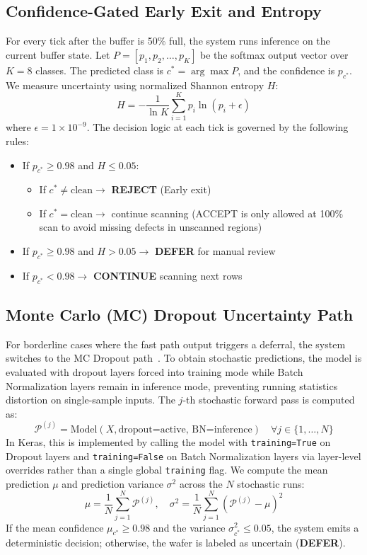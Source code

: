\documentclass[conference]{IEEEtran}
\begin{document}
\subsection{Confidence-Gated Early Exit and Entropy}
For every tick after the buffer is 50\% full, the system runs inference on the current buffer state. Let $P = [p_1, p_2, \dots, p_K]$ be the softmax output vector over $K=8$ classes. The predicted class is $c^* = \arg\max P$, and the confidence is $p_{c^*}$. We measure uncertainty using normalized Shannon entropy $H$:
\begin{equation}
H = -\frac{1}{\ln K} \sum_{i=1}^{K} p_i \ln(p_i + \epsilon)
\end{equation}
where $\epsilon = 1 \times 10^{-9}$. The decision logic at each tick is governed by the following rules:
\begin{itemize}
    \item If $p_{c^*} \ge 0.98$ and $H \le 0.05$:
    \begin{itemize}
        \item If $c^* \neq \text{clean} \rightarrow$ \textbf{REJECT} (Early exit)
        \item If $c^* = \text{clean} \rightarrow$ continue scanning (ACCEPT is only allowed at 100\% scan to avoid missing defects in unscanned regions)
    \end{itemize}
    \item If $p_{c^*} \ge 0.98$ and $H > 0.05 \rightarrow$ \textbf{DEFER} for manual review
    \item If $p_{c^*} < 0.98 \rightarrow$ \textbf{CONTINUE} scanning next rows
\end{itemize}

\subsection{Monte Carlo (MC) Dropout Uncertainty Path}
For borderline cases where the fast path output triggers a deferral, the system switches to the MC Dropout path~\cite{gal2016dropout}. To obtain stochastic predictions, the model is evaluated with dropout layers forced into training mode while Batch Normalization layers remain in inference mode, preventing running statistics distortion on single-sample inputs. The $j$-th stochastic forward pass is computed as:
\begin{equation}
\mathcal{P}^{(j)} = \text{Model}(X, \text{dropout=active, BN=inference}) \quad \forall j \in \{1,\dots,N\}
\end{equation}
In Keras, this is implemented by calling the model with \texttt{training=True} on Dropout layers and \texttt{training=False} on Batch Normalization layers via layer-level overrides rather than a single global \texttt{training} flag. We compute the mean prediction $\mu$ and prediction variance $\sigma^2$ across the $N$ stochastic runs:
\begin{equation}
\mu = \frac{1}{N} \sum_{j=1}^{N} \mathcal{P}^{(j)}, \quad \sigma^2 = \frac{1}{N} \sum_{j=1}^{N} (\mathcal{P}^{(j)} - \mu)^2
\end{equation}
If the mean confidence $\mu_{c^*} \ge 0.98$ and the variance $\sigma^2_{c^*} \le 0.05$, the system emits a deterministic decision; otherwise, the wafer is labeled as uncertain (\textbf{DEFER}).
\end{document}
